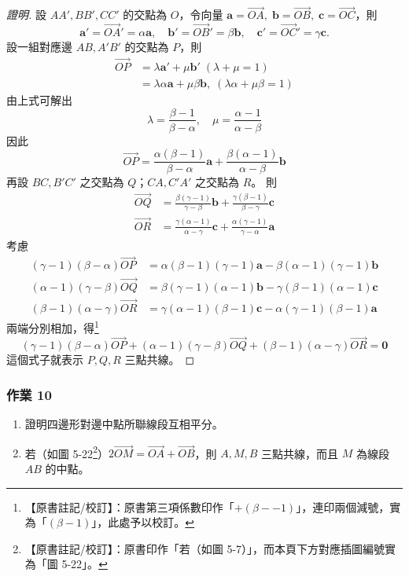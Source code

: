 \begin{proof}[證明]
設 $AA', BB', CC'$ 的交點為 $O$，令向量 $\mathbf{a} = \vec{OA},\; \mathbf{b} = \vec{OB},\; \mathbf{c} = \vec{OC}$，則
\[ \mathbf{a}' = \vec{OA}' = \alpha \mathbf{a},\quad \mathbf{b}' = \vec{OB}' = \beta \mathbf{b},\quad \mathbf{c}' = \vec{OC}' = \gamma \mathbf{c}. \]
設一組對應邊 $AB, A'B'$ 的交點為 $P$，則
\begin{align*}
\vec{OP} &= \lambda \mathbf{a}' + \mu \mathbf{b}' \; (\lambda + \mu = 1) \\
&= \lambda \alpha \mathbf{a} + \mu \beta \mathbf{b},\; (\lambda \alpha + \mu \beta = 1)
\end{align*}
由上式可解出
\[ \lambda = \frac{\beta - 1}{\beta - \alpha},\quad \mu = \frac{\alpha - 1}{\alpha - \beta} \]
因此
\[ \vec{OP} = \frac{\alpha(\beta - 1)}{\beta - \alpha}\mathbf{a} + \frac{\beta(\alpha - 1)}{\alpha - \beta}\mathbf{b} \]
再設 $BC, B'C'$ 之交點為 $Q$；$CA, C'A'$ 之交點為 $R$。
則
\begin{align*}
\vec{OQ} &= \frac{\beta(\gamma - 1)}{\gamma - \beta}\mathbf{b} + \frac{\gamma(\beta - 1)}{\beta - \gamma}\mathbf{c} \\
\vec{OR} &= \frac{\gamma(\alpha - 1)}{\alpha - \gamma}\mathbf{c} + \frac{\alpha(\gamma - 1)}{\gamma - \alpha}\mathbf{a}
\end{align*}
考慮
\begin{align*}
(\gamma - 1)(\beta - \alpha)\vec{OP} &= \alpha(\beta - 1)(\gamma - 1)\mathbf{a} - \beta(\alpha - 1)(\gamma - 1)\mathbf{b} \\
(\alpha - 1)(\gamma - \beta)\vec{OQ} &= \beta(\gamma - 1)(\alpha - 1)\mathbf{b} - \gamma(\beta - 1)(\alpha - 1)\mathbf{c} \\
(\beta - 1)(\alpha - \gamma)\vec{OR} &= \gamma(\alpha - 1)(\beta - 1)\mathbf{c} - \alpha(\gamma - 1)(\beta - 1)\mathbf{a}
\end{align*}
兩端分別相加，得\label{note:b3-ch5-p249-double-minus}\footnote{【原書註記/校訂】：原書第三項係數印作「$+(\beta--1)$」，連印兩個減號，實為「$(\beta - 1)$」，此處予以校訂。}
\[ (\gamma - 1)(\beta - \alpha)\vec{OP} + (\alpha - 1)(\gamma - \beta)\vec{OQ} + (\beta - 1)(\alpha - \gamma)\vec{OR} = \mathbf{0} \]
這個式子就表示 $P, Q, R$ 三點共線。
\end{proof}

\subsubsection*{作業 10}
\begin{enumerate}[label=(\roman*), leftmargin=2.5em]
  \item 證明四邊形對邊中點所聯線段互相平分。
  \item 若（如圖 5-22\label{note:b3-ch5-p249-fig-ref}\footnote{【原書註記/校訂】：原書印作「若（如圖 5-7）」，而本頁下方對應插圖編號實為「圖 5-22」。}）$2\vec{OM} = \vec{OA} + \vec{OB}$，則 $A, M, B$ 三點共線，而且 $M$ 為線段 $AB$ 的中點。
\end{enumerate}

